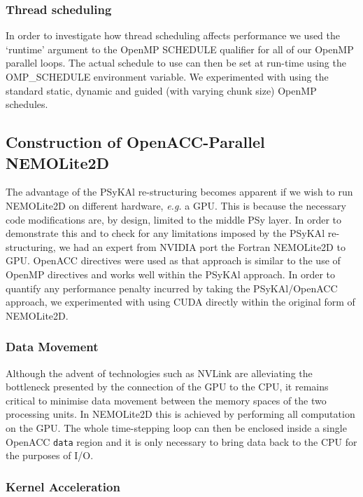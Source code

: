 \documentclass[gmd, manuscript]{copernicus}
\begin{document}
\subsubsection{Thread scheduling}
\label{sec_scheduling}

In order to investigate how thread scheduling affects performance we
used the `runtime' argument to the OpenMP SCHEDULE qualifier for all
of our OpenMP parallel loops. The actual schedule to use can then be
set at run-time using the OMP\_SCHEDULE environment variable. We
experimented with using the standard static, dynamic and guided (with
varying chunk size) OpenMP schedules.

\subsection{Construction of OpenACC-Parallel NEMOLite2D}
\label{sec_oacc_steps}

The advantage of the {PS}y{KA}l re-structuring becomes apparent if we
wish to run NEMOLite2D on different hardware, \textit{e.g.} a
GPU. This is because the necessary code modifications are, by design,
limited to the middle PSy layer. In order to demonstrate this and to
check for any limitations imposed by the {PS}y{KA}l re-structuring, we
had an expert from NVIDIA port the Fortran NEMOLite2D to GPU. OpenACC
directives were used as that approach is similar to the use of OpenMP
directives and works well within the {PS}y{KA}l approach. In order to
quantify any performance penalty incurred by taking the
{PS}y{KA}l/OpenACC approach, we experimented with using CUDA directly
within the original form of NEMOLite2D.

\subsubsection{Data Movement}

Although the advent of technologies such as NVLink are alleviating the
bottleneck presented by the connection of the GPU to the CPU, it
remains critical to minimise data movement between the memory spaces
of the two processing units. In NEMOLite2D this is achieved by
performing all computation on the GPU. The whole time-stepping loop
can then be enclosed inside a single OpenACC \texttt{data} region and it
is only necessary to bring data back to the CPU for the purposes
of I/O.

\subsubsection{Kernel Acceleration}
\end{document}
